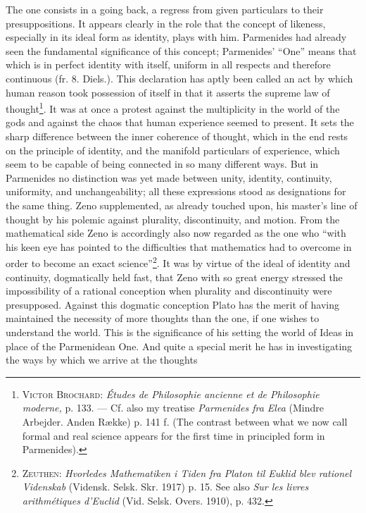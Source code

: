 \documentclass[12pt,a4paper,openany]{book}
\newcommand{\opage}[1]{\marginnote{\footnotesize\textit{[#1]}}}
\begin{document}
The one consists in a going back, a regress from given
particulars to their presuppositions. It appears
clearly in the role that the concept of likeness, especially in its ideal
form as identity, plays with him. Parmenides had
already seen the fundamental significance of this concept; Parmenides’
``One'' means that which is in perfect identity with
itself, uniform in all respects and therefore continuous
(fr. 8. Diels.). This declaration has aptly been called
an act by which human reason took possession of itself
\setcounter{footnote}{0}%
\opage{12}in that it asserts the supreme law of thought\footnote[1]{\textsc{Victor Brochard}: \textit{Études de Philosophie ancienne et de Philosophie moderne,} p. 133. --- Cf. also my treatise \textit{Parmenides fra Elea} (Mindre Arbejder. Anden Række) p. 141 f. (The contrast between what we now call formal and real science appears for the first time in principled form in Parmenides).}. It
was at once a protest against the multiplicity in the world of the gods
and against the chaos that human experience seemed to
present. It sets the sharp difference between the inner
coherence of thought, which in the end rests on the principle of identity,
and the manifold particulars of experience, which seem to
be capable of being connected in so many different ways. But
in Parmenides no distinction was yet made between unity,
identity, continuity, uniformity, and unchangeability; all
these expressions stood as designations for the same thing. Zeno
supplemented, as already touched upon, his master’s line of thought by
his polemic against plurality, discontinuity, and motion.
From the mathematical side Zeno is accordingly also now regarded
as the one who ``with his keen eye has pointed to the
difficulties that mathematics had to overcome in order to
become an exact science''\footnote[2]{\textsc{Zeuthen}: \textit{Hvorledes Mathematiken i Tiden fra Platon til Euklid blev rationel Videnskab} (Vidensk. Selsk. Skr. 1917) p. 15. See also \textit{Sur les livres arithmétiques d’Euclid} (Vid. Selsk. Overs. 1910), p. 432.}. It was by virtue of the ideal of identity and
continuity, dogmatically held fast, that Zeno
with so great energy stressed the impossibility of a rational
conception when plurality and discontinuity were presupposed.
Against this dogmatic conception Plato has the merit
of having maintained the necessity of more thoughts
than the one, if one wishes to understand the world. This is the significance
of his setting the world of Ideas in place of the Parmenidean
One. And quite a special merit he has in
investigating the ways by which we arrive at the thoughts
\end{document}
